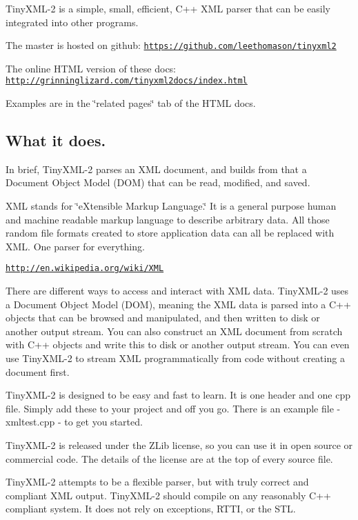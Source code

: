

Tiny\+X\+M\+L-\/2 is a simple, small, efficient, C++ X\+M\+L parser that can be easily integrated into other programs.

The master is hosted on github\+: \href{https://github.com/leethomason/tinyxml2}{\tt https\+://github.\+com/leethomason/tinyxml2}

The online H\+T\+M\+L version of these docs\+: \href{http://grinninglizard.com/tinyxml2docs/index.html}{\tt http\+://grinninglizard.\+com/tinyxml2docs/index.\+html}

Examples are in the \char`\"{}related pages\char`\"{} tab of the H\+T\+M\+L docs.

\subsection*{What it does. }

In brief, Tiny\+X\+M\+L-\/2 parses an X\+M\+L document, and builds from that a Document Object Model (D\+O\+M) that can be read, modified, and saved.

X\+M\+L stands for \char`\"{}e\+Xtensible Markup Language.\char`\"{} It is a general purpose human and machine readable markup language to describe arbitrary data. All those random file formats created to store application data can all be replaced with X\+M\+L. One parser for everything.

\href{http://en.wikipedia.org/wiki/XML}{\tt http\+://en.\+wikipedia.\+org/wiki/\+X\+M\+L}

There are different ways to access and interact with X\+M\+L data. Tiny\+X\+M\+L-\/2 uses a Document Object Model (D\+O\+M), meaning the X\+M\+L data is parsed into a C++ objects that can be browsed and manipulated, and then written to disk or another output stream. You can also construct an X\+M\+L document from scratch with C++ objects and write this to disk or another output stream. You can even use Tiny\+X\+M\+L-\/2 to stream X\+M\+L programmatically from code without creating a document first.

Tiny\+X\+M\+L-\/2 is designed to be easy and fast to learn. It is one header and one cpp file. Simply add these to your project and off you go. There is an example file -\/ xmltest.\+cpp -\/ to get you started.

Tiny\+X\+M\+L-\/2 is released under the Z\+Lib license, so you can use it in open source or commercial code. The details of the license are at the top of every source file.

Tiny\+X\+M\+L-\/2 attempts to be a flexible parser, but with truly correct and compliant X\+M\+L output. Tiny\+X\+M\+L-\/2 should compile on any reasonably C++ compliant system. It does not rely on exceptions, R\+T\+T\+I, or the S\+T\+L.

